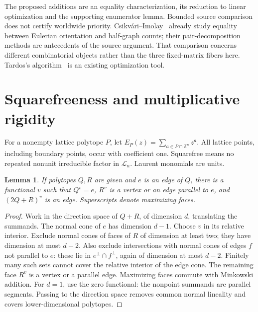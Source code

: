 \documentclass[11pt]{article}
\newtheorem{lemma}[theorem]{Lemma}
\newcommand{\Z}{\mathbb Z}\newcommand{\R}{\mathbb R}\newcommand{\C}{\mathbb C}
\begin{document}
The proposed additions are an equality characterization, its reduction to linear optimization and the supporting enumerator lemma. Bounded source comparison does not certify worldwide priority. Csikvári--Imolay~\cite{CI} already study equality between Eulerian orientation and half-graph counts; their pair-decomposition methods are antecedents of the source argument. That comparison concerns different combinatorial objects rather than the three fixed-matrix fibers here. Tardos's algorithm~\cite{Tardos} is an existing optimization tool.

\section{Squarefreeness and multiplicative rigidity}
For a nonempty lattice polytope \(P\), let
\(E_P(z)=\sum_{a\in P\cap\Z^n}z^a\).
All lattice points, including boundary points, occur with coefficient one.
Squarefree means no repeated nonunit irreducible factor in \(\mathcal L_n\). Laurent monomials are units.

\begin{lemma}\label{lem:edge}
If polytopes \(Q,R\) are given and \(e\) is an edge of \(Q\), there is a functional \(v\) such that \(Q^v=e\), \(R^v\) is a vertex or an edge parallel to \(e\), and \((2Q+R)^v\) is an edge. Superscripts denote maximizing faces.
\end{lemma}
\begin{proof}
Work in the direction space of \(Q+R\), of dimension \(d\), translating the summands. The normal cone of \(e\) has dimension \(d-1\). Choose \(v\) in its relative interior. Exclude normal cones of faces of \(R\) of dimension at least two; they have dimension at most \(d-2\). Also exclude intersections with normal cones of edges \(f\) not parallel to \(e\): these lie in \(e^\perp\cap f^\perp\), again of dimension at most \(d-2\). Finitely many such sets cannot cover the relative interior of the edge cone. The remaining face \(R^v\) is a vertex or a parallel edge. Maximizing faces commute with Minkowski addition. For \(d=1\), use the zero functional: the nonpoint summands are parallel segments. Passing to the direction space removes common normal lineality and covers lower-dimensional polytopes.
\end{proof}
\end{document}
